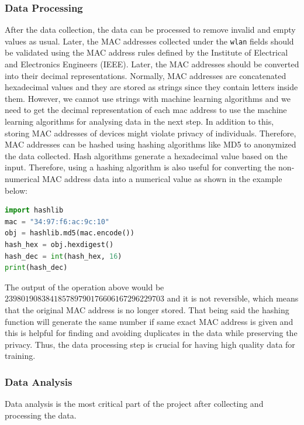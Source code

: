 \documentclass[journal, 12pt]{IEEEtran}
\begin{document}
\subsubsection{Data Processing} 
After the data collection, the data can be processed to remove invalid and empty values as usual. Later, the MAC addresses collected under the \texttt{wlan} fields should be validated using the MAC address rules defined by the Institute of Electrical and Electronics Engineers (IEEE). Later, the MAC addresses should be converted into their decimal representations. Normally, MAC addresses are concatenated hexadecimal values and they are stored as strings since they contain letters inside them. However, we cannot use strings with machine learning algorithms and we need to get the decimal representation of each mac address to use the machine learning algorithms for analysing data in the next step. In addition to this, storing MAC addresses of devices might violate privacy of individuals. Therefore, MAC addresses can be hashed using hashing algorithms like MD5 to anonymized the data collected. Hash algorithms generate a hexadecimal value based on the input. Therefore, using a hashing algorithm is also useful for converting the non-numerical MAC address data into a numerical value as shown in the example below:
\medskip
\begin{lstlisting}[language=python, numbers=none, mathescape]
import hashlib
mac = "34:97:f6:ac:9c:10"
obj = hashlib.md5(mac.encode())
hash_hex = obj.hexdigest()
hash_dec = int(hash_hex, 16)
print(hash_dec)
\end{lstlisting}
\medskip
\noindent The output of the operation above would be $239801908384185789790176606167296229703$ and it is not reversible, which means that the original MAC address is no longer stored. That being said the hashing function will generate the same number if same exact MAC address is given and this is helpful for finding and avoiding duplicates in the data while preserving the privacy. Thus, the data processing step is crucial for having high quality data for training. \\

\subsubsection{Data Analysis} 
Data analysis is the most critical part of the project after collecting and processing the data.
\end{document}
